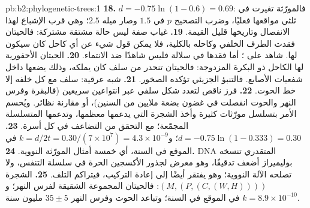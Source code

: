 \begin{solution}{pb:b2:phylogenetic-trees:1}
\textbf{18.} $d = -0.75\ln(1 - 0.6) = 0.69$: فالمورّثة تغيرت في
ثلثي مواقعها فعليًا، وضرب التصحيح
$p$ في $1.5$ وصار ميله $2.5$؛ وهي قرب الإشباع لهذا
الانفصال وتاريخها قليل القيمة.
\textbf{19.} غياب صفة ليس حالة مشتقة مشتركة:
فالحيتان فقدت الطرف الخلفي وكاحله بالكلية، فلا يمكن
قول شيء عن أي كاحل كان سيكون لها. 
شاهد على ؛ أما فقدها في سلالة فليس شاهدًا
ضد الانتماء.
\textbf{20.} الحيتان الأحفورية لها الكاحل ذو البكرة المزدوجة: فالحيتان
تنحدر من سلف كان يملكه، وذلك يضعها داخل
شفعيات الأصابع. فالتنبؤ الجزيئي تؤكده
الصخور.
\textbf{21.} شبه عرقية: سلف مع كل خلفه
إلا خط الحوت.
\textbf{22.} فرز ناقص لتعدد شكل سلفي
عبر انتواعين سريعين (فالبقرة وفرس النهر والحوت انفصلت في غضون
بضعة ملايين من السنين)، أو مقارنة نظائر. ويُحسم الأمر
بتسلسل مورّثات كثيرة وأخذ الشجرة التي يدعمها معظمها، وتدعمها
المتسلسلة المجمّعة؛ مع التحقق من التضاعف في كل أسرة.
\textbf{23.} $d = -0.75\ln(1 - 0.333) = 0.30$؛ و$k = d/2t =
0.30/(7\times 10^{7}) = 4.3\times 10^{-9}$ في الموقع في السنة، أي خمسة
أمثال المورّثة النووية.
\textbf{24.} DNA المتقدري تنسخه بوليميراز أضعف
تدقيقًا، وهو معرض لجذور الأكسجين الحرة في سلسلة
التنفس، ولا تصلحه الآلة النووية؛ وهو
يفتقر أيضًا إلى إعادة التركيب، فيتراكم التلف.
\textbf{25.} الشجرة $(M,(P,(C,(W,H))))$: فالحيتان المجموعة الشقيقة
لفرس النهر؛ و$k = 8.9\times 10^{-10}$ في الموقع في السنة؛ وتباعد
الحوت وفرس النهر $35 \pm 5$ مليون سنة.
\end{solution}
